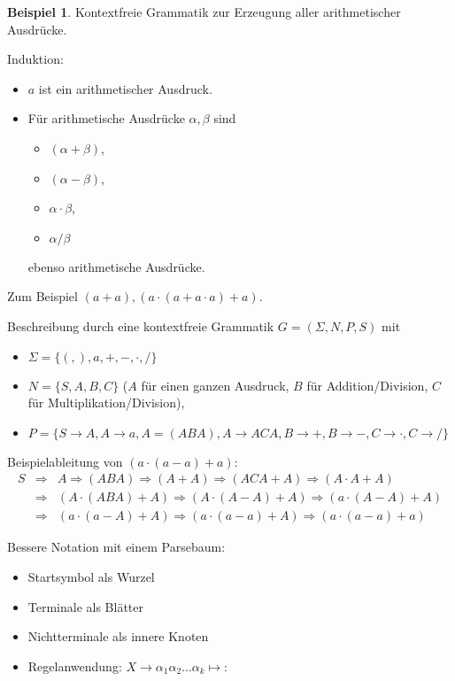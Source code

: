 \documentclass[11pt]{article} %
\theoremstyle{definition}
\newtheorem*{beispiel}{Beispiel}
\begin{document}
\begin{beispiel}
Kontextfreie Grammatik zur Erzeugung aller arithmetischer Ausdrücke.

Induktion:
\begin{itemize}
\item $a$ ist ein arithmetischer Ausdruck.
\item Für arithmetische Ausdrücke $\alpha, \beta$ sind
\begin{itemize}
\item $(\alpha+\beta)$,
\item $(\alpha-\beta)$,
\item $\alpha\cdot \beta$,
\item $\alpha / \beta$
\end{itemize}
ebenso arithmetische Ausdrücke.
\end{itemize}
Zum Beispiel $(a+a), (a\cdot(a+a\cdot a)+a)$.

Beschreibung durch eine kontextfreie Grammatik $G = (\Sigma, N, P, S)$ mit
\begin{itemize}
\item $\Sigma = \{ (, ), a, +, -, \cdot, /\}$
\item $N = \{ S, A, B, C \}$ ($A$ für einen ganzen Ausdruck, $B$ für Addition/Division, $C$ für Multiplikation/Division),
\item $P = \{S \rightarrow A, A \rightarrow a, A = (ABA), A \rightarrow ACA, B \rightarrow +, B \rightarrow -, C \rightarrow \cdot, C \rightarrow / \}$
\end{itemize}

Beispielableitung von $(a\cdot (a -a)+a)$:
\begin{eqnarray*}
S &\Rightarrow& A \Rightarrow (ABA) \Rightarrow (A+A) \Rightarrow (ACA + A) \Rightarrow (A\cdot A+ A) \\ &\Rightarrow& 
 (A \cdot (ABA) + A)
\Rightarrow (A\cdot (A-A)+A) \Rightarrow (a\cdot (A-A)+A) \\ &\Rightarrow& (a\cdot (a-A)+A) 
\Rightarrow (a\cdot (a-a)+A)
\Rightarrow (a\cdot (a-a)+a)
\end{eqnarray*}

\end{beispiel}

Bessere Notation mit einem Parsebaum:
\begin{itemize}
\item Startsymbol als Wurzel
\item Terminale als Blätter
\item Nichtterminale als innere Knoten
\item Regelanwendung: $X \rightarrow \alpha_1\alpha_2\dots \alpha_k \mapsto$:
\end{itemize}
\end{document}
